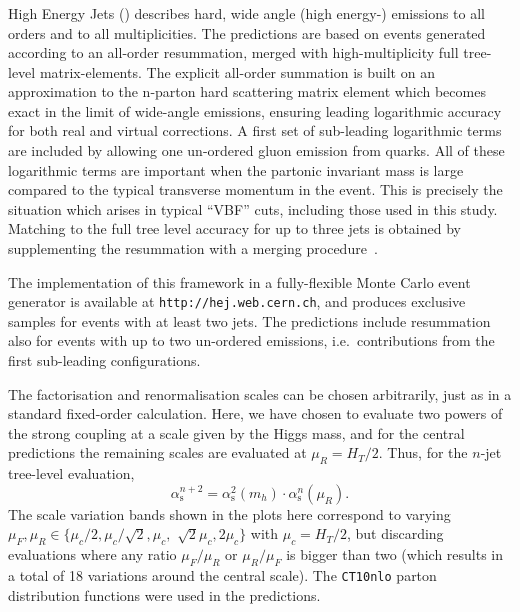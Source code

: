 \subsubsection{\Hej}
\label{sec:hjetscomp:tools:bfkl:hej}

High Energy Jets (\Hej) describes hard, wide angle (high energy-)
emissions to all orders and to all multiplicities. The predictions are based
on events generated according to an all-order resummation, merged with
high-multiplicity full tree-level matrix-elements. The explicit all-order summation
is built on an approximation to the n-parton hard scattering matrix element
\cite{Andersen:2009nu,Andersen:2009he,Andersen:2011hs} which becomes exact in
the limit of wide-angle emissions, ensuring leading logarithmic accuracy for
both real and virtual corrections. A first set of sub-leading logarithmic
terms are included by allowing one un-ordered gluon emission from quarks. All
of these logarithmic terms are important when
the partonic invariant mass is large compared to the typical transverse
momentum in the event. This is precisely the situation which arises in
typical ``VBF'' cuts, including those used in this study.  Matching to the
full tree level accuracy for up to three jets is obtained by supplementing
the resummation with a merging
procedure~\cite{Andersen:2008ue,Andersen:2008gc}.

The implementation of this framework in a fully-flexible Monte Carlo event
generator is available at \texttt{http://hej.web.cern.ch}, and produces
exclusive samples for events with at least two jets.  The predictions include
resummation also for events with up to two un-ordered emissions,
i.e.~contributions from the first sub-leading configurations.

The factorisation and renormalisation scales can be chosen arbitrarily, just
as in a standard fixed-order calculation. Here, we have chosen to evaluate
two powers of the strong coupling at a scale given by the Higgs mass, and for
the central predictions the remaining scales are evaluated at $\mu_R=H_T/2$. Thus,
for the $n$-jet tree-level evaluation, 
\begin{equation}
  \alpha_\mathrm{s}^{n+2}=\alpha_\mathrm{s}^2(m_h)\cdot \alpha_\mathrm{s}^n(\mu_R).
\end{equation}
The scale variation bands shown in the plots here correspond to varying
$\mu_F,\mu_R\in \{\mu_c/2, \mu_c/\sqrt{2}, \mu_c,$ $\sqrt{2}\mu_c, 2\mu_c\}$ with 
$\mu_c=H_T/2$, but discarding evaluations where any ratio $\mu_F/\mu_R$ or 
$\mu_R/\mu_F$ is bigger than two (which results in a total of 18 variations
around the central scale). The \texttt{CT10nlo} \cite{Lai:2010vv,Gao:2013xoa} parton 
distribution functions were used in the predictions.
